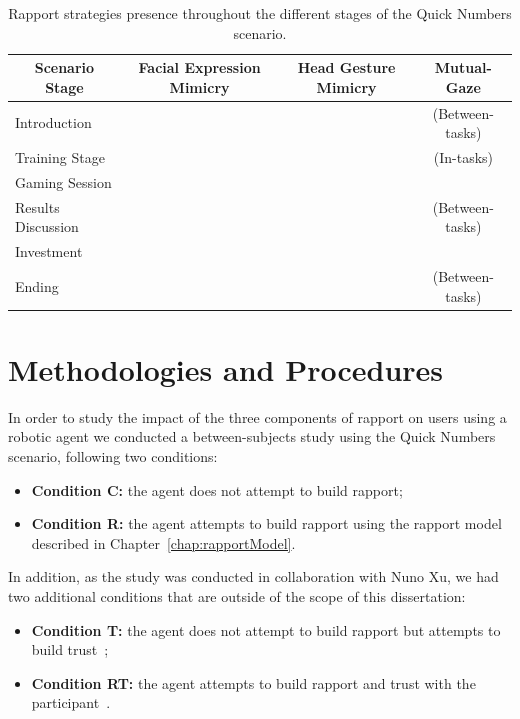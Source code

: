 \begin{table}[H]
	\centering
	\begin{tabular}{|l|c|c|c|}
	\hline
	\multicolumn{1}{|c|}{\textbf{Scenario Stage}} & \textbf{Facial Expression Mimicry} & \textbf{Head Gesture Mimicry} & \textbf{Mutual-Gaze} \\ \hline
	Introduction & \cmark & \cmark & \cmark (Between-tasks) \\ \hline
	Training Stage & \cmark & \cmark & \cmark (In-tasks) \\ \hline
	Gaming Session & \xmark & \xmark & \xmark \\ \hline
	Results Discussion & \cmark & \cmark & \cmark (Between-tasks) \\ \hline
	Investment & \xmark & \xmark & \xmark \\ \hline
	Ending & \cmark & \cmark & \cmark (Between-tasks) \\ \hline
	\end{tabular}
	\caption{Rapport strategies presence throughout the different stages of the Quick Numbers scenario.}
	\label{table:enabledPlugins}
\end{table}

\section{Methodologies and Procedures}
\label{sec:methodsAndProcedures}

In order to study the impact of the three components of rapport on users using a robotic agent we conducted a between-subjects study using the Quick Numbers scenario, following two conditions:

\begin{itemize}
	\item \textbf{Condition C:} the agent does not attempt to build rapport;
	\item \textbf{Condition R:} the agent attempts to build rapport using the rapport model described in Chapter~\ref{chap:rapportModel}.
\end{itemize}

In addition, as the study was conducted in collaboration with Nuno Xu, we had two additional conditions that are outside of the scope of this dissertation:
\begin{itemize}
	\item \textbf{Condition T:} the agent does not attempt to build rapport but attempts to build trust~\cite{Xu2016};
	\item \textbf{Condition RT:} the agent attempts to build rapport and trust with the participant~\cite{Xu2016}.
\end{itemize}

